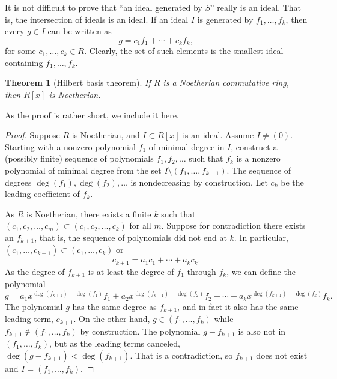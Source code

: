 \documentclass[12pt,openany]{book}
\theoremstyle{plain}
\newtheorem{thm}{Theorem}[section]
\theoremstyle{remark}
\theoremstyle{definition}
\theoremstyle{exercise}
\theoremstyle{example}
\begin{document}
It is not difficult to prove that ``an ideal generated by $S$'' really is
an ideal.  That is, the intersection of ideals is an ideal.
If an ideal $I$ is generated by $f_1,\ldots,f_k$, then every
$g \in I$ can be written as
\begin{equation*}
g = c_1 f_1 + \cdots + c_k f_k,
\end{equation*}
for some $c_1,\ldots,c_k \in R$.  Clearly, the set of such elements is
the smallest ideal containing $f_1,\ldots,f_k$.

\begin{thm}[Hilbert basis theorem] \label{thm:hilbertbasis}
%
If $R$ is a Noetherian commutative ring, then $R[x]$ is Noetherian.
\end{thm}

As the proof is rather short, we include it here.

\begin{proof}
Suppose $R$ is Noetherian, and
$I \subset R[x]$ is an ideal.
Assume $I \neq (0)$.
Starting with a nonzero polynomial $f_1$ of minimal degree in $I$,
construct a (possibly finite) sequence of polynomials $f_1,f_2,\ldots$
such that $f_k$ is a nonzero polynomial of minimal degree
from the set $I \setminus (f_1,\ldots,f_{k-1})$.
The sequence of degrees $\deg(f_1),\deg(f_2),\ldots$ is
nondecreasing by construction.
Let $c_k$ be the leading coefficient of $f_k$.

As $R$ is Noetherian, there exists a finite $k$ such
that $(c_1,c_2,\ldots,c_m) \subset (c_1,c_2,\ldots,c_k)$ for all $m$.
Suppose for contradiction there exists an $f_{k+1}$, that is, the sequence
of polynomials
did not end at $k$.  In particular,
$(c_1,\ldots,c_{k+1}) \subset (c_1,\ldots,c_k)$ or
\begin{equation*}
c_{k+1} = a_1 c_1 + \cdots + a_k c_k .
\end{equation*}
As the degree of $f_{k+1}$ is at least the degree of $f_1$ through $f_k$,
we can define the polynomial
\begin{equation*}
g =
a_1 x^{\deg(f_{k+1})-\deg(f_1)} f_1
+
a_2 x^{\deg(f_{k+1})-\deg(f_2)} f_2
+
\cdots
+
a_k x^{\deg(f_{k+1})-\deg(f_k)} f_k .
\end{equation*}
The polynomial $g$ has the same degree as $f_{k+1}$,
and in fact it also has the same leading term,
$c_{k+1}$.  On the other hand, $g \in (f_1,\ldots,f_{k})$ while
$f_{k+1} \notin (f_1,\ldots,f_k)$ by construction.  The polynomial
$g-f_{k+1}$ is also not in
$(f_1,\ldots,f_k)$, but as the leading terms canceled,
$\deg(g-f_{k+1}) < \deg(f_{k+1})$.
That is a contradiction, so $f_{k+1}$
does not exist and
$I = (f_1,\ldots,f_k)$.
\end{proof}
\end{document}

